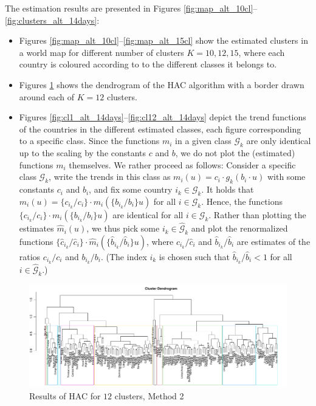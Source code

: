 \documentclass[a4paper,12pt]{article}
\numberwithin{equation}{section}
\begin{document}
The estimation results are presented in Figures \ref{fig:map_alt_10cl}--\ref{fig:clusters_alt_14days}:
\begin{itemize}[leftmargin=0.6cm]
\item Figures \ref{fig:map_alt_10cl}--\ref{fig:map_alt_15cl} show the estimated clusters in a world map for different number of clusters $K =10, 12, 15$, where each country is coloured according to to the different classes it belongs to. 
\item Figures \ref{fig:dend_alt} shows the dendrogram of the HAC algorithm with a border drawn around each of $K = 12$ clusters.
\item Figures \ref{fig:cl1_alt_14days}--\ref{fig:cl12_alt_14days} depict the trend functions of the countries in the different estimated classes, each figure corresponding to a specific class. Since the functions $m_i$ in a given class $\mathcal{G}_k$ are only identical up to the scaling by the constants $c$ and $b$, we do not plot the (estimated) functions $m_i$ themselves. We rather proceed as follows: Consider a specific class $\mathcal{G}_k$,  write the trends in this class as $m_i(u) = c_i \cdot g_k(b_i \cdot u)$ with some constants $c_i$ and $b_i$, and fix some country $i_k \in \mathcal{G}_k$. It holds that $m_i(u) = \{ c_{i_k}/c_i \} \cdot m_i(\{ b_{i_k}/b_i \} u)$ for all $i \in \mathcal{G}_k$. Hence, the functions $\{ c_{i_k}/c_i \} \cdot m_i(\{ b_{i_k}/b_i \} u)$ are identical for all $i \in \mathcal{G}_k$. Rather than plotting the estimates $\hat{m}_i(u)$, we thus pick some $i_k \in \hat{\mathcal{G}}_k$ and plot the renormalized functions $\{ \hat{c}_{i_k}/\hat{c}_i \} \cdot \hat{m}_i(\{ \hat{b}_{i_k}/\hat{b}_i \} u)$, where $\hat{c}_{i_k}/\hat{c}_i$ and $\hat{b}_{i_k}/\hat{b}_i$ are estimates of the ratios $c_{i_k}/c_i$ and $b_{i_k}/b_i$. (The index $i_k$ is chosen such that $\hat{b}_{i_k}/\hat{b}_i < 1$ for all $i \in \hat{\mathcal{G}}_k$.)
\end{itemize}

\newpage 
\FloatBarrier
\begin{figure}
\includegraphics[width=\textwidth]{plots/dendrogram_alt_12}
\caption{Results of HAC for $12$ clusters, Method 2}\label{fig:dend_alt}
\end{figure}
\end{document}
